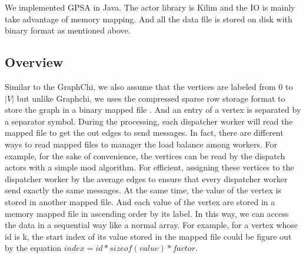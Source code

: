 \documentclass[twocolumn,a4paper,10pt]{article}
\begin{document}
We implemented GPSA in Java. The actor library is Kilim and the IO is mainly take advantage of memory mapping. And all the data file is stored on disk with binary format as mentioned above.

\subsection{Overview}

Similar to the GraphChi, we also assume that the vertices are labeled from $0$ to $|V|$ but unlike Graphchi, we uses the compressed sparse row storage format to store the graph in a binary mapped file . And an entry of a vertex is separated by a separator symbol. During the processing, each dispatcher worker will read the mapped file to get the out edges to send messages. In fact, there are different ways to read mapped files to manager the load balance among workers. For example, for the sake of convenience, the vertices can be read by the dispatch actors with a simple mod algorithm. For efficient, assigning these vertices to the dispatcher worker by the average edges to ensure that every dispatcher worker send exactly the same messages. At the same time, the value of the vertex is stored in another mapped file. And each value of the vertex are stored in a memory mapped file in ascending order by its label. In this way, we can access the data in a sequential way like a normal array. For example, for a vertex whose id is k, the start index of its value stored in the mapped file could be figure out by the equation $index = id * sizeof(value)*factor$. 
\end{document}
